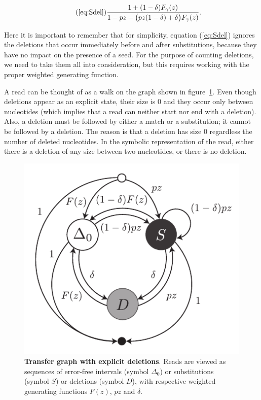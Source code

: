 \documentclass{article}
\begin{document}
\begin{equation}
\tag{\ref{eq:Sdel}}
\frac{1+(1-\delta)F_\gamma(z)}
  {1-pz - \big(pz(1-\delta) + \delta\big)F_\gamma(z)}.
\end{equation}

Here it is important to remember that for simplicity, equation
(\ref{eq:Sdel}) ignores the deletions that occur immediately before and
after substitutions, because they have no impact on the presence of a
seed. For the purpose of counting deletions, we need to take them all into
consideration, but this requires working with the proper weighted
generating function.

A read can be thought of as a walk on the graph shown in
figure~\ref{fig:deletions2}. Even though deletions appear as an explicit
state, their size is $0$ and they occur only between nucleotides (which
implies that a read can neither start nor end with a deletion). Also, a
deletion must be followed by either a match or a substitution; it cannot
be followed by a deletion. The reason is that a deletion has size $0$
regardless the number of deleted nucleotides. In the symbolic
representation of the read, either there is a deletion of any size between
two nucleotides, or there is no deletion.

\begin{figure}[h]
\centering
\includegraphics[scale=0.9]{deletions2.pdf}
\caption{\textbf{Transfer graph with explicit deletions}. 
Reads are viewed as sequences of error-free intervals (symbol $\Delta_0$)
or substitutions (symbol $S$) or deletions (symbol $D$), with respective
weighted generating functions $F(z)$, $pz$ and $\delta$.}
\label{fig:deletions2}
\end{figure}
\end{document}
